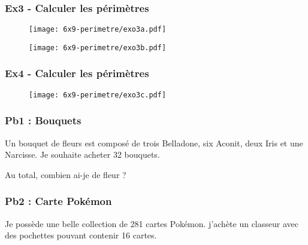 \subsubsection*{Ex3 - Calculer les périmètres} 

\begin{multicols}{2}\noindent
\begin{figure}[H]
  \centering
  \texttt{[image: 6x9-perimetre/exo3a.pdf]}
\end{figure} \columnbreak

\begin{figure}[H]
  \centering
  \texttt{[image: 6x9-perimetre/exo3b.pdf]}
\end{figure} 

\end{multicols}

\Pointilles[15] 

\newpage

\subsubsection*{Ex4 - Calculer les périmètres} 

\begin{multicols}{2}\noindent

\begin{figure}[H]
  \centering
  \texttt{[image: 6x9-perimetre/exo3c.pdf]}
\end{figure} \columnbreak

\Pointilles[10] 

\end{multicols}




\subsubsection*{Pb1 : Bouquets} 

Un bouquet de fleurs est composé de trois Belladone, six Aconit, deux Iris et une Narcisse. Je souhaite acheter 32 bouquets.

Au total, combien ai-je de fleur ?

\Pointilles[6] 


\subsubsection*{Pb2 : Carte Pokémon} 

Je possède une belle collection de 281 cartes Pokémon. j’achète un classeur avec des pochettes pouvant contenir 16 cartes.

